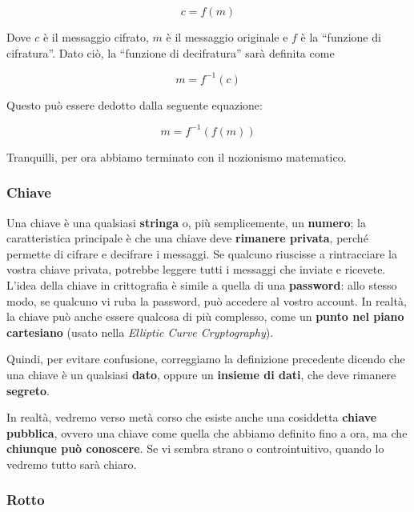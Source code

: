 \documentclass{rapport}
\begin{document}
\begin{equation*}
    c = f(m)
\end{equation*}

Dove $c$ è il messaggio cifrato, $m$ è il messaggio originale e $f$ è la “funzione di cifratura”. Dato ciò, la “funzione di decifratura” sarà definita come


\begin{equation*}
    m = f^{-1}(c)
\end{equation*}

Questo può essere dedotto dalla seguente equazione:


\begin{equation*}
    m = f^{-1}(f(m)) 
\end{equation*}

Tranquilli, per ora abbiamo terminato con il nozionismo matematico.


\subsubsection{Chiave} 

Una chiave è una qualsiasi \textbf{stringa} o, più semplicemente, un \textbf{numero}; la caratteristica principale è che una chiave deve \textbf{rimanere privata}, perché permette di cifrare e decifrare i messaggi. Se qualcuno riuscisse a rintracciare la vostra chiave privata, potrebbe leggere tutti i messaggi che inviate e ricevete. L’idea della chiave in crittografia è simile a quella di una \textbf{password}: allo stesso modo, se qualcuno vi ruba la password, può accedere al vostro account. In realtà, la chiave può anche essere qualcosa di più complesso, come un \textbf{punto nel piano cartesiano} (usato nella \textit{Elliptic Curve Cryptography}).

Quindi, per evitare confusione, correggiamo la definizione precedente dicendo che una chiave è un qualsiasi \textbf{dato}, oppure un \textbf{insieme di dati}, che deve rimanere \textbf{segreto}.

In realtà, vedremo verso metà corso che esiste anche una cosiddetta \textbf{chiave pubblica}, ovvero una chiave come quella che abbiamo definito fino a ora, ma che \textbf{chiunque può conoscere}. Se vi sembra strano o controintuitivo, quando lo vedremo tutto sarà chiaro.


\subsubsection{Rotto} 
\end{document}
